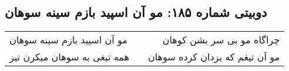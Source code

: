 \begin{center}
\section*{دوبیتی شماره ۱۸۵: مو آن اسپید بازم سینه سوهان}
\label{sec:185}
\begin{longtable}{l p{0.5cm} r}
مو آن اسپید بازم سینه سوهان
&&
چراگاه مو بی سر بشن کوهان
\\
همه تیغی به سوهان میکرن تیز
&&
مو آن تیغم که یزدان کرده سوهان
\\
\end{longtable}
\end{center}
